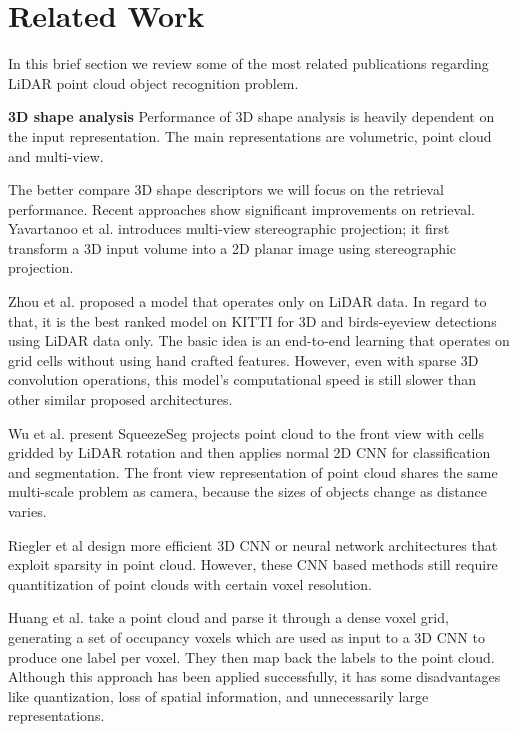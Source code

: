 \section{Related Work}\label{sec:relatedWork}
In this brief section we review some of the most related publications regarding LiDAR point cloud object recognition problem.

\textbf{3D shape analysis} Performance of 3D shape analysis is heavily dependent on the input representation. The main representations are volumetric, point cloud and multi-view.

The better compare 3D shape descriptors we will focus on the retrieval performance. Recent approaches show significant improvements on retrieval. Yavartanoo et al. \cite{DBLP:journals/corr/abs-1811-01571} introduces multi-view stereographic projection; it first transform a 3D input volume into a 2D planar image using stereographic projection.

Zhou et al. \cite{Zhou_2018_CVPR} proposed a model that operates only on LiDAR data. In regard to that, it is the best ranked model on KITTI \cite{geiger2012we} for 3D and birds-eyeview detections using LiDAR data only. The basic idea is an end-to-end learning that operates on grid cells without using hand crafted features. However, even with sparse 3D convolution operations, this model's computational speed is still slower than other similar proposed architectures.


Wu et al. \cite{DBLP:conf/icra/WuWYK18} present SqueezeSeg projects point cloud to the front view with cells gridded by LiDAR rotation and then applies normal 2D CNN for classification and segmentation. The front view representation of point cloud shares the same multi-scale problem as camera, because the sizes of objects change as distance varies.

Riegler et al \cite{DBLP:conf/cvpr/RieglerUG17} design more efficient 3D CNN or neural network architectures that exploit sparsity in point cloud. However, these CNN based methods still require quantitization of point clouds with certain voxel resolution.

Huang et al. \cite{DBLP:conf/icpr/HuangY16} take a point cloud and parse it through a dense voxel grid, generating a set of occupancy voxels which are used as input to a 3D CNN to produce one label per voxel. They then map back the labels to the point cloud. Although this approach has been applied successfully, it has some disadvantages like quantization, loss of spatial information, and unnecessarily large representations.

